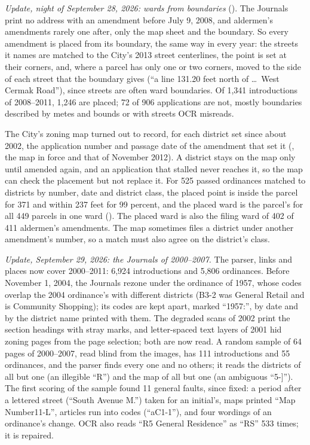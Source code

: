 \textit{Update, night of September 28, 2026: wards from boundaries}
(). The Journals print no address with an amendment before July 9, 2008,
and aldermen's amendments rarely one after, only the map sheet and the boundary. So every amendment is placed from its
boundary, the same way in every year: the streets it names are matched to the City's 2013 street centerlines, the
point is set at their corners, and, where a parcel has only one or two corners, moved to the side of each street
that the boundary gives (``a line 131.20 feet north of \ldots\ West Cermak Road''), since streets are often ward
boundaries. Of 1,341 introductions of 2008--2011, 1,246 are placed; 72 of 906 applications are not, mostly
boundaries described by metes and bounds or with streets OCR misreads.

The City's zoning map turned out to record, for each district set since about 2002, the application number and
passage date of the amendment that set it (, the map in force and that of
November 2012). A district stays on the map only until amended again, and an application that stalled never reaches
it, so the map can check the placement but not replace it. For 525 passed ordinances matched to districts by number,
date and district class, the placed point is inside the parcel for 371 and within 237 feet for 99 percent, and the
placed ward is the parcel's for all 449 parcels in one ward (). The placed
ward is also the filing ward of 402 of 411 aldermen's amendments. The map sometimes files a district under another
amendment's number, so a match must also agree on the district's class.

\textit{Update, September 29, 2026: the Journals of 2000--2007.} The parser, links and places now cover 2000--2011:
6,924 introductions and 5,806 ordinances. Before November 1, 2004, the Journals rezone under the ordinance of 1957,
whose codes overlap the 2004 ordinance's with different districts (B3-2 was General Retail and is Community Shopping);
its codes are kept apart, marked ``1957:'', by date and by the district name printed with them. The degraded scans
of 2002 print the section headings with stray marks, and letter-spaced text layers of 2001 hid zoning pages from the
page selection; both are now read. A random sample of 64 pages of 2000--2007, read blind from the images, has 111
introductions and 55 ordinances, and the parser finds every one and no others; it reads the districts of all but one
(an illegible ``R\textcent'') and the map of all but one (an ambiguous ``5-]''). The first scoring of the sample found
11 general faults, since fixed: a period after a lettered street (``South Avenue M.'') taken for an initial's, maps
printed ``Map Number11-L'', articles run into codes (``aC1-1''), and four wordings of an ordinance's change. OCR also
reads ``R5 General Residence'' as ``RS'' 533 times; it is repaired.

